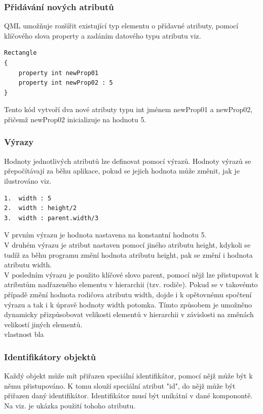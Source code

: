 \documentclass[report,11pt]{elsarticle}
\begin{document}
\subsubsection{Přidávání nových atributů}
QML umožňuje rozšířit existující typ elementu o přídavné atributy, pomocí klíčového slova property a zadáním  datového typu atributu viz. 
\begin{lstlisting}[frame=single,caption=Ukázka deklarace dvou nových atributů.]
Rectangle
{
	property int newProp01
	property int newProp02 : 5
}
\end{lstlisting}
Tento kód vytvoří dva nové atributy typu int jménem newProp01 a newProp02, přičemž newProp02 inicializuje na hodnotu 5.
\subsubsection{Výrazy}
Hodnoty jednotlivých atributů lze definovat pomocí výrazů. Hodnoty výrazů se přepočítávají za běhu aplikace, pokud se jejich hodnota může změnit, jak je ilustrováno viz.
\begin{lstlisting}[frame=single,caption=Několik ilustrativních příkladů formy výrazů.]
1.	width : 5
2.	width : height/2
3.	width : parent.width/3
\end{lstlisting}
V prvním výrazu je hodnota nastavena na konstantní hodnotu 5.\\
V druhém výrazu je atribut nastaven pomocí jiného atributu height, kdykoli se tudíž za běhu programu změní hodnota atributu height, pak se změní i hodnota atributu width.\\
V posledním výrazu je použito klíčové slovo parent, pomocí nějž lze přistupovat k atributům nadřazeného elementu v hierarchii (tzv. rodiče). Pokud se v takovémto případě změní hodnota rodičova atributu width, dojde i k opětovnému spočtení výrazu a tak i k úpravě hodnoty width potomka. Tímto způsobem je umožněno dynamicky přizpůsobovat velikosti elementů v hierarchii v závislosti na změnách velikostí jiných elementů.\\
vlastnost bla


\subsubsection{Identifikátory objektů}
Každý objekt může mít přiřazen speciální identifikátor, pomocí nějž může být k němu přistupováno.  K tomu slouží speciální atribut "id", do nějž může být přiřazen daný identifikátor. Identifikátor musí být unikátní v dané komponontě. Na viz. je ukázka použití tohoho atributu.
\end{document}
